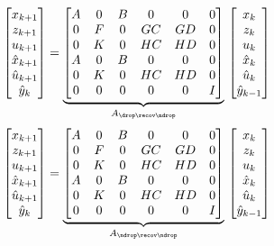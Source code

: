 %
\begin{equation}
    \begin{bmatrix}
        x_{k+1} \\
        z_{k+1} \\
        u_{k+1} \\
        \hat x_{k+1} \\
        \hat u_{k+1} \\
        \hat y_{k} \\
    \end{bmatrix} = \underbrace{\begin{bmatrix}
        A & 0 & B & 0 & 0 & 0 \\
        0 & F & 0 & GC & GD & 0 \\
        0 & K & 0 & HC & HD & 0 \\
        A & 0 & B & 0 & 0 & 0 \\
        0 & K & 0 & HC & HD & 0 \\
        0 & 0 & 0 & 0 & 0 & I
    \end{bmatrix}}_{A_{\drop\recov\ndrop}}\, \begin{bmatrix}
        x_{k} \\
        z_{k} \\
        u_{k} \\
        \hat x_{k} \\
        \hat u_{k} \\
        \hat y_{k-1} \\
    \end{bmatrix}
\end{equation}
%
\begin{equation}
    \begin{bmatrix}
        x_{k+1} \\
        z_{k+1} \\
        u_{k+1} \\
        \hat x_{k+1} \\
        \hat u_{k+1} \\
        \hat y_{k} \\
    \end{bmatrix} = \underbrace{\begin{bmatrix}
        A & 0 & B & 0 & 0 & 0 \\
        0 & F & 0 & GC & GD & 0 \\
        0 & K & 0 & HC & HD & 0 \\
        A & 0 & B & 0 & 0 & 0 \\
        0 & K & 0 & HC & HD & 0 \\
        0 & 0 & 0 & 0 & 0 & I
    \end{bmatrix}}_{A_{\ndrop\recov\ndrop}}\, \begin{bmatrix}
        x_{k} \\
        z_{k} \\
        u_{k} \\
        \hat x_{k} \\
        \hat u_{k} \\
        \hat y_{k-1} \\
    \end{bmatrix}
\end{equation}
